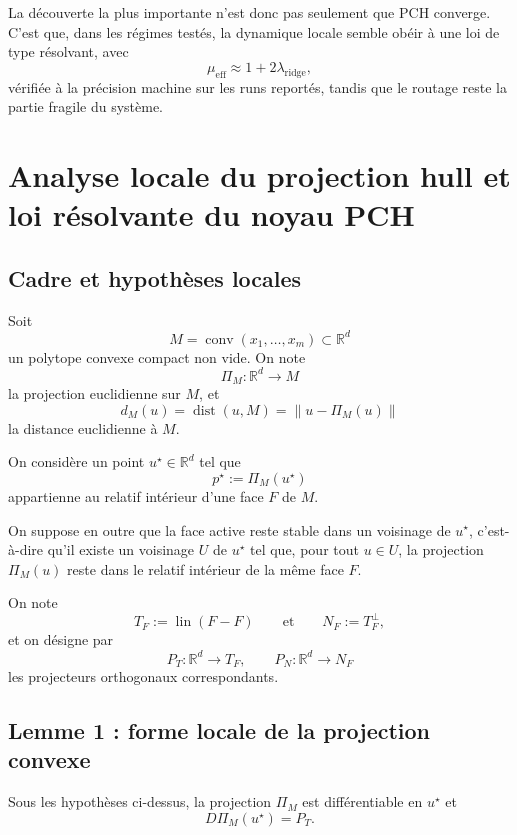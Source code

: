 La découverte la plus importante n’est donc pas seulement que PCH converge.
C’est que, dans les régimes testés, la dynamique locale semble obéir à une loi de type résolvant,
avec
\[
\mu_{\mathrm{eff}} \approx 1 + 2\lambda_{\mathrm{ridge}},
\]
vérifiée à la précision machine sur les runs reportés, tandis que le routage reste la partie fragile du système.





\section{Analyse locale du projection hull et loi résolvante du noyau PCH}

\subsection{Cadre et hypothèses locales}

Soit
\[
M=\operatorname{conv}(x_1,\dots,x_m)\subset\mathbb R^d
\]
un polytope convexe compact non vide. On note
\[
\Pi_M:\mathbb R^d\to M
\]
la projection euclidienne sur $M$, et
\[
d_M(u)=\operatorname{dist}(u,M)=\|u-\Pi_M(u)\|
\]
la distance euclidienne à $M$.

On considère un point $u^\star\in\mathbb R^d$ tel que
\[
p^\star:=\Pi_M(u^\star)
\]
appartienne au relatif intérieur d'une face $F$ de $M$.

On suppose en outre que la face active reste stable dans un voisinage de $u^\star$, c'est-à-dire qu'il existe un voisinage $U$ de $u^\star$ tel que, pour tout $u\in U$, la projection $\Pi_M(u)$ reste dans le relatif intérieur de la même face $F$.

On note
\[
T_F:=\operatorname{lin}(F-F)
\qquad\text{et}\qquad
N_F:=T_F^\perp,
\]
et on désigne par
\[
P_T:\mathbb R^d\to T_F,\qquad P_N:\mathbb R^d\to N_F
\]
les projecteurs orthogonaux correspondants.

\subsection{Lemme 1 : forme locale de la projection convexe}

\begin{lemma}
Sous les hypothèses ci-dessus, la projection $\Pi_M$ est différentiable en $u^\star$ et
\[
D\Pi_M(u^\star)=P_T.
\]
\end{lemma}

